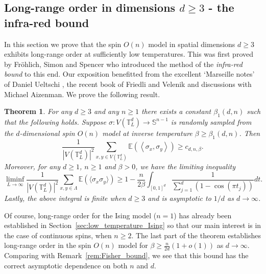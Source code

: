 \documentclass[12pt,reqno]{article}
\def\E{\mathbb{E}}
\def\T{\mathbb{T}}
\newtheorem{theorem}{Theorem}[section]
\begin{document}
\subsection{Long-range order in dimensions $d\ge 3$ - the infra-red
bound}\label{sec:infra-red_bound} In this section we prove that the
spin $O(n)$ model in spatial dimensions $d\ge 3$ exhibits long-range
order at sufficiently low temperatures. This was first proved by
Fr\"ohlich, Simon and Spencer \cite{FroSimSpe76} who introduced the
method of the \emph{infra-red bound} to this end. Our exposition benefitted from the excellent `Marseille notes' of Daniel Ueltschi \cite[Lecture 2, part 2]{Ueltschi2013}, the recent book of Friedli and Velenik \cite[Chapter 10]{friedli2016statistical} and discussions with Michael Aizenman.
We prove the following result.
\begin{theorem}\label{thm:long_range_order}
For any $d\ge 3$ and any $n\ge 1$ there exists a constant $\beta_1(d,n)$ such that the following holds. Suppose $\sigma:V(\T_L^d)\to \mathbb
S^{n-1}$ is randomly sampled from the $d$-dimensional spin $O(n)$
model at inverse temperature $\beta \ge \beta_1(d,n)$. Then
\begin{equation*}
   \frac{1}{|V(\T_L^d)|^2}\sum_{x,y\in
V(\T_L^d)}\E(\left\langle\sigma_x,\sigma_y\right\rangle) \ge c_{d,n,\beta}.
\end{equation*}
Moreover, for any $d \ge 1$, $n \ge 1$ and $\beta>0$, we have the limiting inequality
\[ \liminf_{L \to \infty} \frac{1}{|V(\T_L^d)|^2} \sum_{x,y \in \Lambda} \E\left( \langle \sigma_x \sigma_y \rangle \right) \ge 1 - \frac{n}{2\beta} \int_{[0,1]^d} \frac{1}{\sum_{j=1}^d (1 - \cos(\pi t_j))}dt .\]
Lastly, the above integral is finite when $d \ge 3$ and is asymptotic to $1/d$ as $d \to \infty$.
\end{theorem}

Of course, long-range order for the Ising model ($n=1$) has already been established in
Section~\ref{sec:low_temperature_Ising} so that our main interest is
in the case of continuous spins, when $n\ge 2$. The last part of the theorem establishes long-range order in the spin $O(n)$ model for $\beta\ge \frac{n}{2d}(1+o(1))$ as $d\to\infty$. Comparing with Remark~\ref{rem:Fisher_bound}, we see that this bound has the correct asymptotic dependence on both $n$ and $d$.
\end{document}
